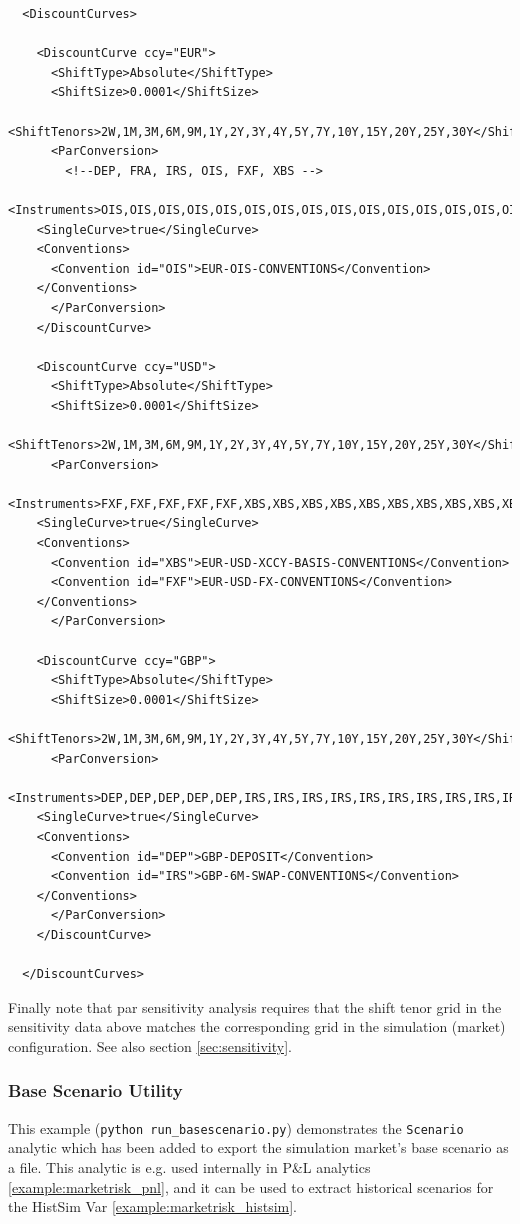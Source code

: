 \begin{verbatim}
  <DiscountCurves>
  
    <DiscountCurve ccy="EUR">
      <ShiftType>Absolute</ShiftType>
      <ShiftSize>0.0001</ShiftSize>
      <ShiftTenors>2W,1M,3M,6M,9M,1Y,2Y,3Y,4Y,5Y,7Y,10Y,15Y,20Y,25Y,30Y</ShiftTenors>
      <ParConversion>
        <!--DEP, FRA, IRS, OIS, FXF, XBS -->
	<Instruments>OIS,OIS,OIS,OIS,OIS,OIS,OIS,OIS,OIS,OIS,OIS,OIS,OIS,OIS,OIS,OIS</Instruments>
	<SingleCurve>true</SingleCurve>
	<Conventions>
	  <Convention id="OIS">EUR-OIS-CONVENTIONS</Convention>
	</Conventions>
      </ParConversion>
    </DiscountCurve>   
    
    <DiscountCurve ccy="USD">
      <ShiftType>Absolute</ShiftType>
      <ShiftSize>0.0001</ShiftSize>
      <ShiftTenors>2W,1M,3M,6M,9M,1Y,2Y,3Y,4Y,5Y,7Y,10Y,15Y,20Y,25Y,30Y</ShiftTenors>
      <ParConversion>
	<Instruments>FXF,FXF,FXF,FXF,FXF,XBS,XBS,XBS,XBS,XBS,XBS,XBS,XBS,XBS,XBS,XBS</Instruments>
	<SingleCurve>true</SingleCurve>
	<Conventions>
	  <Convention id="XBS">EUR-USD-XCCY-BASIS-CONVENTIONS</Convention>
	  <Convention id="FXF">EUR-USD-FX-CONVENTIONS</Convention>
	</Conventions>
      </ParConversion>

    <DiscountCurve ccy="GBP">
      <ShiftType>Absolute</ShiftType>
      <ShiftSize>0.0001</ShiftSize>
      <ShiftTenors>2W,1M,3M,6M,9M,1Y,2Y,3Y,4Y,5Y,7Y,10Y,15Y,20Y,25Y,30Y</ShiftTenors>
      <ParConversion>
	<Instruments>DEP,DEP,DEP,DEP,DEP,IRS,IRS,IRS,IRS,IRS,IRS,IRS,IRS,IRS,IRS,IRS</Instruments>
	<SingleCurve>true</SingleCurve>
	<Conventions>
	  <Convention id="DEP">GBP-DEPOSIT</Convention>
	  <Convention id="IRS">GBP-6M-SWAP-CONVENTIONS</Convention>
	</Conventions>
      </ParConversion>
    </DiscountCurve>
  
  </DiscountCurves>
\end{verbatim}

Finally note that par sensitivity analysis requires that the shift tenor grid in the sensitivity data above matches the corresponding grid in the simulation (market) configuration. 
See also section \ref{sec:sensitivity}.

\subsubsection{Base Scenario Utility}
\label{example:marketrisk_basescenario}

This example ({\tt python run\_basescenario.py}) demonstrates the {\tt Scenario} analytic which
has been added to export the simulation market's base scenario as a file. This analytic is e.g.
used internally in P\&L analytics \ref{example:marketrisk_pnl}, and it can be used to extract
historical scenarios for the HistSim Var \ref{example:marketrisk_histsim}.

